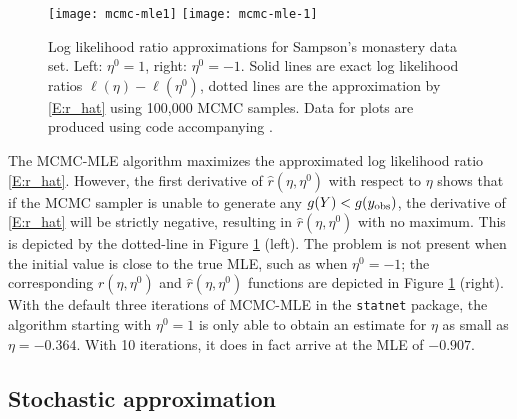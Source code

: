 \begin{figure}[h]  \label{F:MCMC-MLE}
\begin{center} 
{\texttt{[image: mcmc-mle1]}}
{\texttt{[image: mcmc-mle-1]}}
\end{center} 
\caption[Log likelihood ratio approximations for Sampson's monastery data set]{Log likelihood ratio approximations for Sampson's monastery data set.  Left: $\eta^0 = 1$, right: $\eta^0 = -1$. Solid lines are exact log likelihood ratios $\ell(\eta) - \ell(\eta^0)$, dotted lines are the 
approximation by \eqref{E:r_hat} using 100,000 MCMC samples.  Data for plots are produced using code accompanying \citet{Hummel}.} 
\end{figure} 

The MCMC-MLE algorithm maximizes the approximated log 
likelihood ratio \eqref{E:r_hat}.  However, the first derivative of $\hat{r}(\eta,\eta^0)$ with respect
to $\eta$ shows that if the MCMC sampler is unable to generate any $g(Y)< g(y_{\text{obs}})$, 
the derivative of 
\eqref{E:r_hat} will be strictly negative, resulting in $\hat{r}(\eta,\eta^0)$ with no
maximum.  This is depicted by the dotted-line in Figure \ref{F:MCMC-MLE} (left).  
The problem is not present when the initial value is close to the true MLE, such as 
when $\eta^0 = -1$; the corresponding $r(\eta,\eta^0)$ and $\hat{r}(\eta,\eta^0)$ 
functions are depicted in Figure \ref{F:MCMC-MLE} (right).  With the default three 
iterations of MCMC-MLE in the \texttt{statnet} package, the algorithm 
starting with $\eta^0 = 1$ is only able to obtain an estimate for $\eta$ as 
small as $\eta = -0.364$.  With 10 iterations, it does in fact 
arrive at the MLE of $-0.907$.
 





%

    

\subsection{Stochastic approximation}

